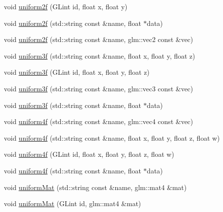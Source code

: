 \begin{DoxyCompactItemize}
void \mbox{\hyperlink{class_beer_engine_1_1_graphics_1_1_shader_program_acf8ee7ffb6ea8d29b4180bcd29f79f54}{uniform2f}} (G\+Lint id, float x, float y)
\item 
void \mbox{\hyperlink{class_beer_engine_1_1_graphics_1_1_shader_program_a92794e30b9ee5e79e3e09114d36ecf22}{uniform2f}} (std\+::string const \&name, float $\ast$data)
\item 
void \mbox{\hyperlink{class_beer_engine_1_1_graphics_1_1_shader_program_a7568ddafee4777ef5776ef8e7967994a}{uniform2f}} (std\+::string const \&name, glm\+::vec2 const \&vec)
\item 
void \mbox{\hyperlink{class_beer_engine_1_1_graphics_1_1_shader_program_a5c040e91d1e70c913e85d34697a1e33f}{uniform3f}} (std\+::string const \&name, float x, float y, float z)
\item 
void \mbox{\hyperlink{class_beer_engine_1_1_graphics_1_1_shader_program_a3044bd52410d43c5ed58b5db0f84be13}{uniform3f}} (G\+Lint id, float x, float y, float z)
\item 
void \mbox{\hyperlink{class_beer_engine_1_1_graphics_1_1_shader_program_aff28ec6e574385d817a03435aec393c2}{uniform3f}} (std\+::string const \&name, glm\+::vec3 const \&vec)
\item 
void \mbox{\hyperlink{class_beer_engine_1_1_graphics_1_1_shader_program_af0488800441bc89118f173b1512d7254}{uniform3f}} (std\+::string const \&name, float $\ast$data)
\item 
void \mbox{\hyperlink{class_beer_engine_1_1_graphics_1_1_shader_program_ac2819747448fdaff830aea62913b932b}{uniform4f}} (std\+::string const \&name, glm\+::vec4 const \&vec)
\item 
void \mbox{\hyperlink{class_beer_engine_1_1_graphics_1_1_shader_program_a38c33da991e2c955c2f6a415d747b432}{uniform4f}} (std\+::string const \&name, float x, float y, float z, float w)
\item 
void \mbox{\hyperlink{class_beer_engine_1_1_graphics_1_1_shader_program_a40984a7550bbe0fb20e696d3794007a6}{uniform4f}} (G\+Lint id, float x, float y, float z, float w)
\item 
void \mbox{\hyperlink{class_beer_engine_1_1_graphics_1_1_shader_program_aea02b6f42e752a49ca5ac8b6be19732b}{uniform4f}} (std\+::string const \&name, float $\ast$data)
\item 
void \mbox{\hyperlink{class_beer_engine_1_1_graphics_1_1_shader_program_aefc5f7af9799e46a5c9efc4a84c43915}{uniform\+Mat}} (std\+::string const \&name, glm\+::mat4 \&mat)
\item 
void \mbox{\hyperlink{class_beer_engine_1_1_graphics_1_1_shader_program_a0269320ff9aab4c4834f4a66d77ae028}{uniform\+Mat}} (G\+Lint id, glm\+::mat4 \&mat)
\end{DoxyCompactItemize}
